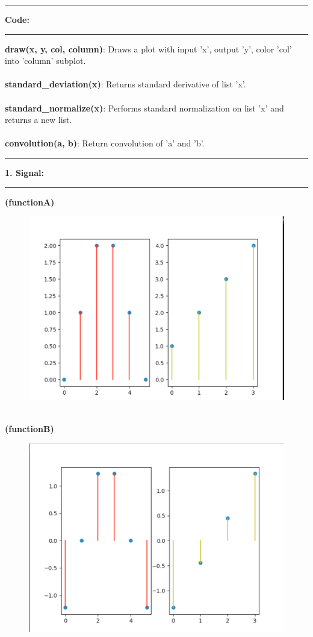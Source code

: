 \documentclass[11pt]{article}
\newcommand\question[2]{\vspace{.25in}\hrule\textbf{#1: #2}\vspace{.5em}\hrule\vspace{.10in}}
\renewcommand\part[1]{\vspace{.10in}\textbf{(#1)}}
\begin{document}
\raggedright
	\newcommand\NAME{Muhammed Burak Bugrul}
	\newcommand\ANDREWID{150140015}
	\newcommand\HWNUM{1} 
    \question{Code}{}
        \textbf{draw(x, y, col, column)}: Draws a plot with input 'x', output 'y', color 'col' into 'column' subplot.\\
        \
        \\
        \textbf{standard\_deviation(x)}: Returns standard derivative of list 'x'.\\
        \
        \\
        \textbf{standard\_normalize(x)}: Performs standard normalization on list 'x' and returns a new list.\\
        \
        \\
        \textbf{convolution(a, b)}: Return convolution of 'a' and 'b'.\\
        \cleardoublepage
	\question{1. Signal}{}
    \part{functionA}
    \begin{figure}[h]
        \centering
        \includegraphics[width=0.5\linewidth]{figures/1a.png}
        \label{fig:1a}
    \end{figure}\\
    \part{functionB}
    \begin{figure}[h]
        \centering
        \includegraphics[width=0.5\linewidth]{figures/1b.png}
        \label{fig:1b}
    \end{figure}\\
\end{document}
